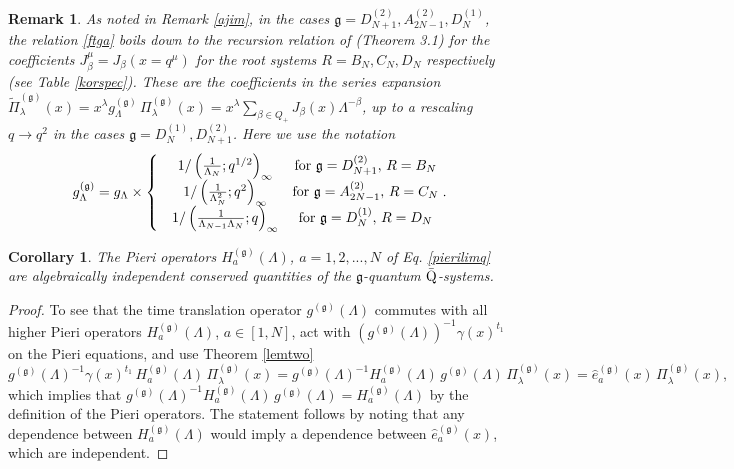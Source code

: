 \documentclass[12pt]{amsart}
\newtheorem{cor}[thm]{Corollary}
\newtheorem{remark}[thm]{Remark}
\newcommand{\barQ}{$\bar{\rm Q}$}
\newcommand{\g}{{\mathfrak{g}}}
\newcommand{\lL}{{\Lambda}}
\numberwithin{equation}{section}
\begin{document}
\begin{remark}\label{newajim} As noted in Remark \ref{ajim}, in the cases $\g=D_{N+1}^{(2)},A_{2N-1}^{(2)},D_{N}^{(1)}$,
the relation \eqref{ftga} boils down to the recursion relation of \cite{FJMMfermio}
(Theorem 3.1) for the coefficients $J_\beta^\mu=J_\beta(x=q^\mu)$ for the root systems $R=B_N, C_N, D_N $ respectively (see Table \ref{korspec}). These are the coefficients in the series expansion
$\tilde \Pi^{(\g)}_\lambda(x)=x^\lambda g^{(\g)}_\Lambda\,\Pi^{(\g)}_\lambda(x)=x^\lambda\sum_{\beta \in Q_+}J_\beta(x)\Lambda^{-\beta} $, up to a rescaling $q\to q^2$ in the cases $\g=D_N^{(1)},D_{N+1}^{(2)}$. 
Here we use the notation
$$g^{(\g)}_\Lambda = g_\Lambda \times \left\{ \begin{matrix} &1/\left(\frac{1}{\Lambda_{N}};q^{1/2}\right)_\infty & {\rm for}\ \g=D_{N+1}^{(2)},\,R=B_N\\
&1/\left(\frac{1}{\Lambda_{N}^2};q^2\right)_\infty & {\rm for}\ \g=A_{2N-1}^{(2)},\,R=C_N\\
&1/\left(\frac{1}{\Lambda_{N-1}\Lambda_N};q\right)_\infty & {\rm for}\ \g=D_{N}^{(1)},\,R=D_N
\end{matrix}\right. .$$
\end{remark}

\begin{cor}\label{integrability}
The Pieri operators $H_a^{(\g)}(\lL)$, $a=1,2,...,N$ of Eq. \eqref{pierilimq} are algebraically independent conserved quantities of the $\g$-quantum \barQ-systems.
\end{cor}
\begin{proof}
To see that the time translation operator $g^{(\g)}(\lL)$  commutes with all higher Pieri operators $H_a^{(\g)}(\lL)$, $a\in[1,N]$, 
%
act with $(g^{(\g)}(\lL))^{-1}\gamma(x)^{t_1}$ on
the Pieri equations, and use Theorem \ref{lemtwo} 
$$g^{(\g)}(\lL)^{-1}\gamma(x)^{t_1}\,H_a^{(\g)}(\lL)\, \Pi_\lambda^{(\g)}(x)=g^{(\g)}(\lL)^{-1}H_a^{(\g)}(\lL)\,g^{(\g)}(\lL)\,\Pi_\lambda^{(\g)}(x)
={\hat e}_a^{(\g)}(x)\, \Pi_\lambda^{(\g)}(x),$$
which implies that $g^{(\g)}(\lL)^{-1}H_a^{(\g)}(\lL)\,g^{(\g)}(\lL)=H_a^{(\g)}(\lL)$ by the definition of the Pieri operators. The statement follows by noting that any dependence between $H_a^{(\g)}(\lL)$ would imply a dependence between $\hat e_a^{(\g)}(x)$, which are independent. 
%
\end{proof}
\end{document}

